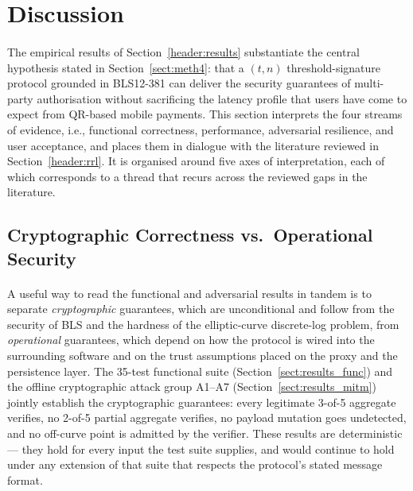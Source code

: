 \section{Discussion}
\label{header:discussion}

\paragraph{}The empirical results of Section~\ref{header:results} substantiate the central hypothesis stated in Section~\ref{sect:meth4}: that a $(t, n)$ threshold-signature protocol grounded in BLS12-381 can deliver the security guarantees of multi-party authorisation without sacrificing the latency profile that users have come to expect from QR-based mobile payments. This section interprets the four streams of evidence, i.e., functional correctness, performance, adversarial resilience, and user acceptance, and places them in dialogue with the literature reviewed in Section~\ref{header:rrl}. It is organised around five axes of interpretation, each of which corresponds to a thread that recurs across the reviewed gaps in the literature.

\subsection{Cryptographic Correctness vs.\ Operational Security}
\label{sect:disc_crypto}

\paragraph{}A useful way to read the functional and adversarial results in tandem is to separate \textit{cryptographic} guarantees, which are unconditional and follow from the security of BLS and the hardness of the elliptic-curve discrete-log problem, from \textit{operational} guarantees, which depend on how the protocol is wired into the surrounding software and on the trust assumptions placed on the proxy and the persistence layer. The 35-test functional suite (Section~\ref{sect:results_func}) and the offline cryptographic attack group A1--A7 (Section~\ref{sect:results_mitm}) jointly establish the cryptographic guarantees: every legitimate 3-of-5 aggregate verifies, no 2-of-5 partial aggregate verifies, no payload mutation goes undetected, and no off-curve point is admitted by the verifier. These results are deterministic --- they hold for every input the test suite supplies, and would continue to hold under any extension of that suite that respects the protocol's stated message format.

